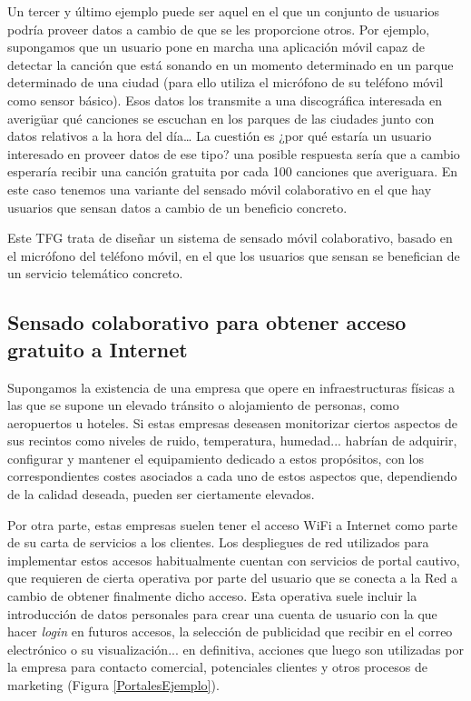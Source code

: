Un tercer y último ejemplo puede ser aquel en el que un conjunto de usuarios podría proveer datos a cambio de que se les proporcione otros. Por ejemplo, supongamos que un usuario pone en marcha una aplicación móvil capaz de detectar la canción que está sonando en un momento determinado en un parque determinado de una ciudad (para ello utiliza el micrófono de su teléfono móvil como sensor básico). Esos datos los transmite a una discográfica interesada en averigüar qué canciones se escuchan en los parques de las ciudades junto con datos relativos a la hora del día… La cuestión es ¿por qué estaría un usuario interesado en proveer datos de ese tipo? una posible respuesta sería que a cambio esperaría recibir una canción gratuita por cada 100 canciones que averiguara. En este caso tenemos una variante del sensado móvil colaborativo en el que hay usuarios que sensan datos a cambio de un beneficio concreto.

Este TFG trata de diseñar un sistema de sensado móvil colaborativo, basado en el micrófono del teléfono móvil, en el que los usuarios que sensan se benefician de un servicio telemático concreto.

\subsection{Sensado colaborativo para obtener acceso gratuito a Internet}

Supongamos la existencia de una empresa que opere en infraestructuras físicas a las que se supone un elevado tránsito o alojamiento de personas, como aeropuertos u hoteles. Si estas empresas deseasen monitorizar ciertos aspectos de sus recintos como niveles de ruido, temperatura, humedad... habrían de adquirir, configurar y mantener el equipamiento dedicado a estos propósitos, con los correspondientes costes asociados a cada uno de estos aspectos que, dependiendo de la calidad deseada, pueden ser ciertamente elevados.

Por otra parte, estas empresas suelen tener el acceso WiFi a Internet como parte de su carta de servicios a los clientes. Los despliegues de red utilizados para implementar estos accesos habitualmente cuentan con servicios de portal cautivo, que requieren de cierta operativa por parte del usuario que se conecta a la Red a cambio de obtener finalmente dicho acceso. Esta operativa suele incluir la introducción de datos personales para crear una cuenta de usuario con la que hacer \emph{login} en futuros accesos, la selección de publicidad que recibir en el correo electrónico o su visualización... en definitiva, acciones que luego son utilizadas por la empresa para contacto comercial, potenciales clientes y otros procesos de marketing (Figura \ref{PortalesEjemplo}).


